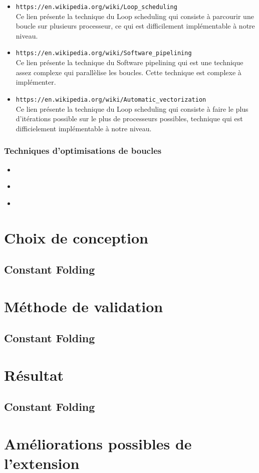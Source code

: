 \documentclass[a4paper]{article}
\begin{document}
\begin{itemize}
\item \texttt{https://en.wikipedia.org/wiki/Loop\_scheduling} \\
Ce lien présente la technique du Loop scheduling qui consiste à parcourir une boucle sur plusieurs processeur, ce qui est difficilement implémentable à notre niveau.\\

\item \texttt{https://en.wikipedia.org/wiki/Software\_pipelining} \\
Ce lien présente la technique du Software pipelining qui est une technique assez complexe qui parallèlise les boucles. Cette technique est complexe à implémenter.

\item \texttt{https://en.wikipedia.org/wiki/Automatic\_vectorization} \\
Ce lien présente la technique du Loop scheduling qui consiste à faire le plus d'itérations possible sur le plus de processeurs possibles, technique qui est difficielement implémentable à notre niveau.\\
     \end{itemize}

\subsubsection{Techniques d'optimisations de boucles}
\begin{itemize}
\item \texttt{} \\
\item \texttt{} \\
\item \texttt{} \\


     \end{itemize}
\section{Choix de conception}
\subsection{Constant Folding}
\section{Méthode de validation}
\subsection{Constant Folding}
\section{Résultat}
\subsection{Constant Folding}
\section{Améliorations possibles de l'extension}
\end{document}
